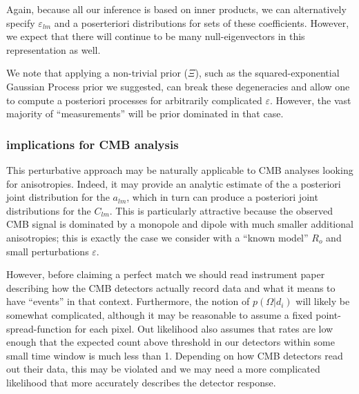 \documentclass{article}
\begin{document}
Again, because all our inference is based on inner products, we can alternatively specify $\varepsilon_{lm}$ and a poserteriori distributions for sets of these coefficients. 
However, we expect that there will continue to be many null-eigenvectors in this representation as well.

We note that applying a non-trivial prior ($\Xi$), such as the squared-exponential Gaussian Process prior we suggested, can break these degeneracies and allow one to compute a posteriori processes for arbitrarily complicated $\varepsilon$.
However, the vast majority of ``measurements'' will be prior dominated in that case.

\subsubsection*{implications for CMB analysis}

This perturbative approach may be naturally applicable to CMB analyses looking for anisotropies. 
Indeed, it may provide an analytic estimate of the a posteriori joint distribution for the $a_{lm}$, which in turn can produce a posteriori joint distributions for the $C_{lm}$.
This is particularly attractive because the observed CMB signal is dominated by a monopole and dipole with much smaller additional anisotropies; this is exactly the case we consider with a ``known model'' $R_o$ and small perturbations $\varepsilon$.

However, before claiming a perfect match we should read instrument paper describing how the CMB detectors actually record data and what it means to have ``events'' in that context. 
Furthermore, the notion of $p(\Omega|d_i)$ will likely be somewhat complicated, although it may be reasonable to assume a fixed point-spread-function for each pixel.
Out likelihood also assumes that rates are low enough that the expected count above threshold in our detectors within some small time window is much less than 1.
Depending on how CMB detectors read out their data, this may be violated and we may need a more complicated likelihood that more accurately describes the detector response.

\end{document}
